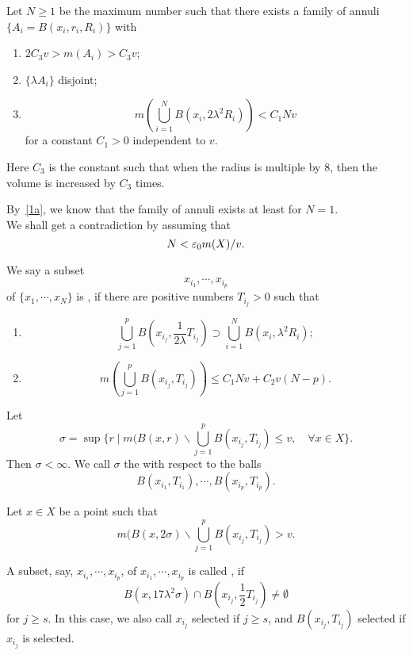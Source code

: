 Let $N\geq 1$ be the maximum number such that 
there exists a family of annuli $\{A_i=B(x_i, r_i, R_i)\}$ with
\begin{enumerate}
\item $2C_3v>m(A_i)>C_3v$;
\item $\{\lambda A_i\}$ disjoint;
\item
\[
m(\bigcup_{i=1}^NB(x_i, 2\lambda^2 R_i))<C_1Nv
\]
for a constant $C_1>0$ independent to $v$. 
\end{enumerate}
Here $C_3$ is the constant such that when the radius is multiple by $8$, then the volume is increased by $C_3$ times. 
\vspace{.3in}

By~\eqref{1a}, we know that the family of annuli exists at least for $N=1$.\\

We shall get a contradiction by 
assuming that
\begin{equation}\label{0-0}
N<\varepsilon_0 m(X)/v.
\end{equation}



\begin{definition}
 We say a subset 
\[
x_{i_1},\cdots, x_{i_p}
\]
of $\{x_1,\cdots, x_N\}$ is \emph{}, if there are positive numbers $T_{i_j}>0$ such that 
\begin{enumerate}
\item 
\[
\bigcup_{j=1}^{p} B(x_{i_j}, \frac{1}{2\lambda}T_{i_j})\supset \bigcup_{i=1}^{N} B(x_i,   \lambda^2R_i);
\]
\item
\[
m(\bigcup_{j=1}^{p} B(x_{i_j}, T_{i_j}))\leq C_1Nv+C_2v(N-p).
\]
\end{enumerate}
\end{definition}

\begin{definition}
Let
\[
\sigma=\sup \{r\mid m(B(x,r)\backslash \bigcup_{j=1} ^p B(x_{i_j}, T_{i_j})\leq v,\quad  \forall x\in X \}.
\]
Then $\sigma<\infty$. 
We call $\sigma$ the \emph{} with respect to the balls 
\[
B(x_{i_1}, T_{i_1}),\cdots, B(x_{i_p}, T_{i_p}).
\]
\end{definition}

Let $x\in X$ be a point such that 
\[
m(B(x,2\sigma)\backslash \bigcup_{j=1} ^p B(x_{i_j}, T_{i_j})>v.
\]

\begin{definition}
A subset, say,  $x_{i_s},\cdots, x_{i_p}$, of $x_{i_1},\cdots, x_{i_p}$ is called  \emph{}, if
\[
B(x,17\lambda^2 \sigma)\cap B(x_{i_j}, \frac 12 T_{i_j})\neq\emptyset
\]
for $j\geq s$. In this case, we also call $x_{i_j}$  selected if $j\geq s$, and  $B(x_{i_j}, T_{i_j})$ selected if $x_{i_j}$ is selected. 
\end{definition}


